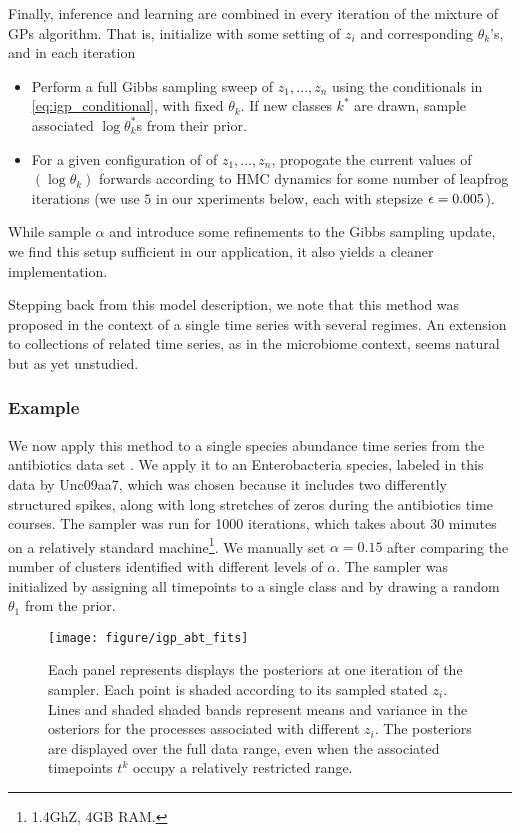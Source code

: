 \documentclass[14pt]{extreport}
\begin{document}
Finally, inference and learning are combined in every iteration of the mixture
of GPs algorithm. That is, initialize with some setting of $z_i$ and
corresponding $\theta_k$'s, and in each iteration
\begin{itemize}
\item Perform a full Gibbs sampling sweep of $z_1, \dots, z_n$ using the
  conditionals in \ref{eq:igp_conditional}, with fixed $\theta_k$. If new
  classes $k^\ast$ are drawn, sample associated $\log \theta_k^\ast$s from their
  prior.
\item For a given configuration of of $z_1, \dots, z_n$, propogate the current
  values of $\left(\log \theta_k\right)$ forwards according to HMC dynamics for
  some number of leapfrog iterations (we use $5$ in our xperiments below, each
  with stepsize $\epsilon = 0.005$).
\end{itemize}

While \citep{rasmussen2006gaussian} sample $\alpha$ and introduce some refinements to
the Gibbs sampling update, we find this setup sufficient in our application, it
also yields a cleaner implementation.

Stepping back from this model description, we note that this method was
proposed in the context of a single time series with several regimes. An
extension to collections of related time series, as in the microbiome context,
seems natural but as yet unstudied.

\subsubsection{Example}
\label{subsubsec:igp_mix_example}

We now apply this method to a single species abundance time series from the
antibiotics data set \citep{dethlefsen2011incomplete}. We apply it to an
Enterobacteria species, labeled in this data by Unc09aa7, which was chosen
because it includes two differently structured spikes, along with long stretches
of zeros during the antibiotics time courses. The sampler was run for 1000
iterations, which takes about 30 minutes on a relatively standard
machine\footnote{1.4GhZ, 4GB RAM.}. We manually set $\alpha = 0.15$ after
comparing the number of clusters identified with different levels of $\alpha$.
The sampler was initialized by assigning all timepoints to a single class and by
drawing a random $\theta_1$ from the prior.

\begin{figure}
  \centering
  \texttt{[image: figure/igp\_abt\_fits]}
  \caption{Each panel represents displays the posteriors at one iteration of the
    sampler. Each point is shaded according to its sampled stated $z_i$. Lines
    and shaded shaded bands represent means and variance in the osteriors for
    the processes associated with different $z_i$. The posteriors are displayed
    over the full data range, even when the associated timepoints $t^k$ occupy a
    relatively restricted range. \label{fig:igp_abt_fits}}
\end{figure}
\end{document}
